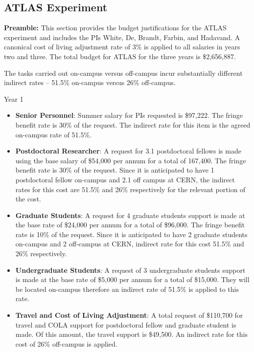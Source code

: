\subsection{ATLAS Experiment}
{\bf Preamble:} This section provides the budget justifications for the ATLAS experiment and includes the PIs White, De, Brandt, Farbin, and Hadavand.  A canonical cost of living adjustment rate of 3\% is applied to all salaries in years two and three. 
The total budget for ATLAS for the three years is \$2,656,887.

The tasks carried out on-campus versus off-campus incur substantially different indirect rates – 51.5\% on-campus versus 26\% off-campus. 

\item{Year 1}
\begin{itemize}
\item{{\bf Senior Personnel}: Summer salary for PIs requested is \$97,222.   The fringe benefit rate is 30\% of the request.  The indirect rate for this item is the agreed on-campus rate of 51.5\%.}

\item {{\bf Postdoctoral Researcher}: A request for 3.1 postdoctoral fellows is made using the base salary of \$54,000 per annum for a total of 167,400.  The fringe benefit rate is 30\% of the request.  Since it is anticipated to have 1 postdoctoral fellow on-campus and 2.1 off campus at CERN, the indirect rates for this cost are 51.5\%  and 26\% respectively for the relevant portion of the cost.} 

\item{{\bf Graduate Students}: A request for 4 graduate students support is made at the base rate of \$24,000 per annum for a total of \$96,000.   The fringe benefit rate is 10\% of the request.  Since it is anticipated to have 2 graduate students on-campus and 2 off-campus at CERN, indirect rate for this cost 51.5\% and 26\% respectively.}

\item {{\bf Undergraduate Students}: A request of 3 undergraduate students support is made at the base rate of \$5,000 per annum for a total of \$15,000. They will be located on-campus therefore an indirect rate of 51.5\% is applied to this rate. }

\item{{\bf Travel and Cost of Living Adjustment}: A total request of \$110,700 for travel and COLA support for postdoctoral fellow and graduate student is made. Of this amount, the travel support is \$49,500.  An indirect rate for this cost of 26\% off-campus is applied. }


\end{itemize}
